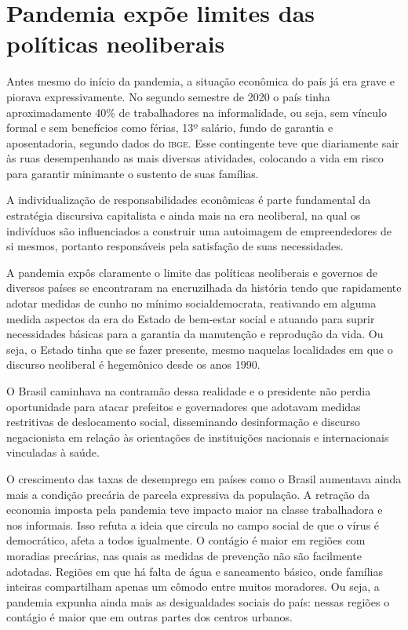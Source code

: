 \section{Pandemia expõe limites das políticas neoliberais}

Antes mesmo do início da pandemia, a situação econômica do país já era
grave e piorava expressivamente. No segundo semestre de 2020 o país
tinha aproximadamente 40\% de trabalhadores na informalidade, ou seja,
sem vínculo formal e sem benefícios como férias, 13º salário, fundo de
garantia e aposentadoria, segundo dados do \textsc{ibge}. Esse contingente teve que diariamente
sair às ruas desempenhando as mais diversas atividades, colocando a vida
em risco para garantir minimante o sustento de suas famílias.

A individualização de responsabilidades econômicas é parte fundamental
da estratégia discursiva capitalista e ainda mais na era neoliberal, na
qual os indivíduos são influenciados a construir uma autoimagem de
empreendedores de si mesmos, portanto responsáveis pela satisfação de
suas necessidades.

A pandemia expôs claramente o limite das políticas neoliberais e
governos de diversos países se encontraram na encruzilhada da história
tendo que rapidamente adotar medidas de cunho no mínimo socialdemocrata,
reativando em alguma medida aspectos da era do Estado de bem-estar
social e atuando para suprir necessidades básicas para a garantia da
manutenção e reprodução da vida. Ou seja, o Estado tinha que se fazer
presente, mesmo naquelas localidades em que o discurso neoliberal é
hegemônico desde os anos 1990.

O Brasil caminhava na contramão dessa realidade e o presidente não
perdia oportunidade para atacar prefeitos e governadores que adotavam
medidas restritivas de deslocamento social, disseminando desinformação e
discurso negacionista em relação às orientações de instituições
nacionais e internacionais vinculadas à saúde.

O crescimento das taxas de desemprego em países como o Brasil aumentava
ainda mais a condição precária de parcela expressiva da população. A
retração da economia imposta pela pandemia teve impacto maior na classe
trabalhadora e nos informais. Isso refuta a ideia que circula no campo
social de que o vírus é democrático, afeta a todos igualmente. O
contágio é maior em regiões com moradias precárias, nas quais as medidas
de prevenção não são facilmente adotadas. Regiões em que há falta de
água e saneamento básico, onde famílias inteiras compartilham apenas um
cômodo entre muitos moradores. Ou seja, a pandemia expunha ainda mais as
desigualdades sociais do país: nessas regiões o contágio é maior que em
outras partes dos centros urbanos.

